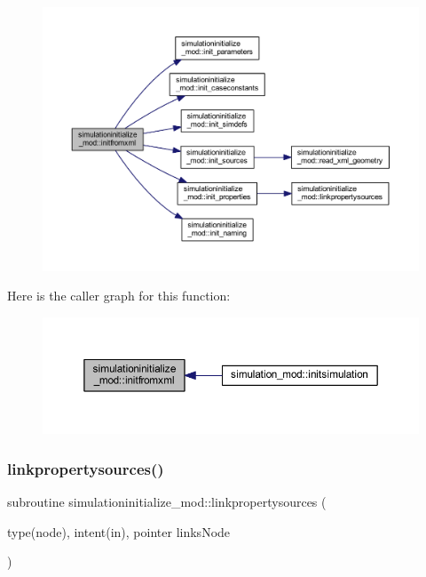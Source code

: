 \begin{figure}[H]
\begin{center}
\leavevmode
\includegraphics[width=350pt]{namespacesimulationinitialize__mod_ada0310fe0d45fa2eec30deaf3ad25ba7_cgraph}
\end{center}
\end{figure}
Here is the caller graph for this function\+:\nopagebreak
\begin{figure}[H]
\begin{center}
\leavevmode
\includegraphics[width=350pt]{namespacesimulationinitialize__mod_ada0310fe0d45fa2eec30deaf3ad25ba7_icgraph}
\end{center}
\end{figure}
\mbox{\label{namespacesimulationinitialize__mod_aa4c1099b84c9901ab1286a3796a54f71}} 
\subsubsection{\texorpdfstring{linkpropertysources()}{linkpropertysources()}}
{\footnotesize\ttfamily subroutine simulationinitialize\+\_\+mod\+::linkpropertysources (\begin{DoxyParamCaption}\item[{type(node), intent(in), pointer}]{links\+Node }\end{DoxyParamCaption})\hspace{0.3cm}{\ttfamily [private]}}



